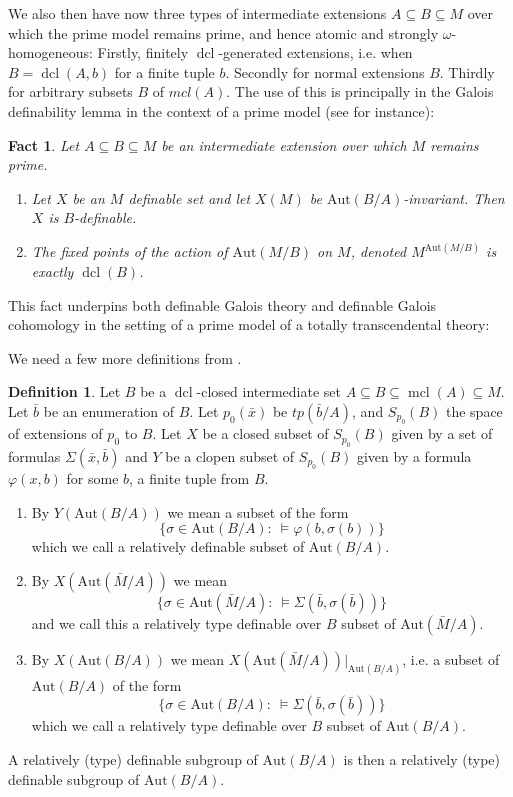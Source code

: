 \documentclass{amsart}
\newtheorem{fact}[theorem]{Fact}
\theoremstyle{definition}
\newtheorem{definition}[theorem]{Definition}
\theoremstyle{remark}
\numberwithin{equation}{section}
\def \tp {tp}
\def \aut {\text{Aut}}
\def \mcl {\operatorname{mcl}}
\def \dcl {\operatorname{dcl}}
\begin{document}
We also then have now three types of intermediate extensions $A \subseteq B \subseteq M$ over which the prime model remains prime, and hence atomic and strongly $\omega$-homogeneous: Firstly, finitely $\dcl$-generated extensions, i.e. when $B = \dcl(A,b)$ for a finite tuple $b$. Secondly for normal extensions $B$. Thirdly for arbitrary subsets $B$ of $mcl(A)$.  The use of this is principally in the Galois definability lemma in the context of a prime model (see \cite{meretzky2026galoistheoryautomorphismgroups} for instance):

\begin{fact}\cite{meretzky2026galoistheoryautomorphismgroups}
Let $A \subseteq B \subseteq M$ be an intermediate extension over which $M$ remains prime. 

\begin{enumerate}
    \item Let $X$ be an $M$ definable set and let $X(M)$ be $\aut(B/A)$-invariant. Then $X$ is $B$-definable.
    \item The fixed points of the action of $\aut(M/B)$ on $M$, denoted $M^{\aut(M/B)}$ is exactly $\dcl(B)$.
\end{enumerate} 
\end{fact}

This fact underpins both definable Galois theory and definable Galois cohomology in the setting of a prime model of a totally transcendental theory:

We need a few more definitions from \cite{meretzky2026galoistheoryautomorphismgroups}.

\begin{definition}\cite{meretzky2026galoistheoryautomorphismgroups}
    Let $B$ be a $\dcl$-closed intermediate set $A \subseteq B \subseteq \mcl(A) \subseteq M$. Let $\bar{b}$ be an enumeration of $B$.  Let $p_0(\bar{x})$ be $\tp(\bar{b}/A)$, and $S_{p_0}(B)$ the space of extensions of $p_0$ to $B$. Let $X$ be a closed subset of $S_{p_0}(B)$ given by a set of formulas $\Sigma(\bar{x},\bar{b})$ and $Y$ be a clopen subset of $S_{p_0}(B)$ given by a formula  $\varphi(x,b)$ for some $b$, a finite tuple from $B$.
    \begin{enumerate}
        \item By $Y(\aut(B/A))$ we mean a subset of the form $$\{\sigma \in \aut(B/A) : \ \models \varphi(b,\sigma(b))\}$$ which we call a relatively definable subset of $\aut(B/A)$. 
        \item By $X(\aut(\bar{M}/A))$ we mean $$\{\sigma \in \aut(\bar{M}/A) : \ \models \Sigma(\bar{b},\sigma(\bar{b}))\}$$ and we call this a relatively type definable over $B$ subset of $\aut(\bar{M}/A)$.
        \item By $X(\aut(B/A))$ we mean $X(\aut(\bar{M}/A))|_{\aut(B/A)}$, i.e. a subset of $\aut(B/A)$ of the form $$\{\sigma \in \aut(B/A) : \ \models \Sigma(\bar{b},\sigma(\bar{b}))\}$$ which we call a relatively type definable over $B$ subset of $\aut(B/A)$.
    \end{enumerate}
    A relatively (type) definable subgroup of $\aut(B/A)$ is then a relatively (type) definable subgroup of $\aut(B/A)$.
\end{definition}
\end{document}

